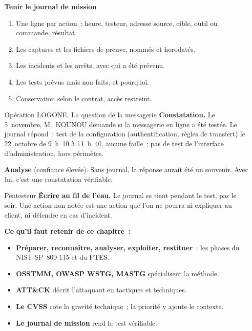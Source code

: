 \begin{boxprocedure}
\textbf{Tenir le journal de mission}
\begin{enumerate}
    \item Une ligne par action~: heure, testeur, adresse source, cible,
          outil ou commande, résultat.
    \item Les captures et les fichiers de preuve, nommés et horodatés.
    \item Les incidents et les arrêts, avec qui a été prévenu.
    \item Les tests prévus mais non faits, et pourquoi.
    \item Conservation selon le contrat, accès restreint.
\end{enumerate}
\end{boxprocedure}

\begin{boxscenario}{Opération LOGONE. La question de la messagerie}
\textbf{Constatation.} Le 5~novembre, M.~KOUNOU demande si la messagerie en
ligne a été testée. Le journal répond~: test de la configuration
(authentification, règles de transfert) le 22~octobre de 9~h~10 à 11~h~40,
aucune faille~; pas de test de l'interface d'administration, hors périmètre.

\medskip
\textbf{Analyse} (confiance élevée). Sans journal, la réponse aurait été un
souvenir. Avec lui, c'est une constatation vérifiable.
\end{boxscenario}

\begin{boxmetier}{Pentesteur}
\textbf{Écrire au fil de l'eau.} Le journal se tient pendant le test, pas
le soir. Une action non notée est une action que l'on ne pourra ni
expliquer au client, ni défendre en cas d'incident.
\end{boxmetier}

\separateur

\begin{boxresume}
\textbf{Ce qu'il faut retenir de ce chapitre~:}
\begin{itemize}
    \item \textbf{Préparer, reconnaître, analyser, exploiter, restituer}~:
          les phases du NIST SP~800-115 et du PTES.
    \item \textbf{OSSTMM, OWASP WSTG, MASTG} spécialisent la méthode.
    \item \textbf{ATT\&CK} décrit l'attaquant en tactiques et techniques.
    \item \textbf{Le CVSS} cote la gravité technique~; la priorité y ajoute
          le contexte.
    \item \textbf{Le journal de mission} rend le test vérifiable.
\end{itemize}
\end{boxresume}

